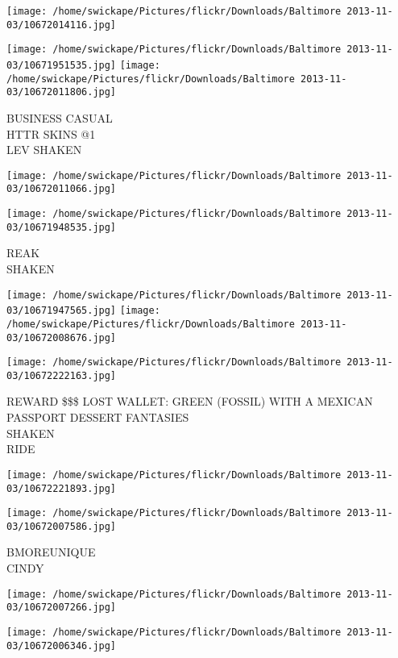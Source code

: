 \documentclass[10pt,letterpaper]{article}
\begin{document}
\texttt{[image: /home/swickape/Pictures/flickr/Downloads/Baltimore 2013-11-03/10672014116.jpg]}

\vspace{0.25in}
\texttt{[image: /home/swickape/Pictures/flickr/Downloads/Baltimore 2013-11-03/10671951535.jpg]}
\texttt{[image: /home/swickape/Pictures/flickr/Downloads/Baltimore 2013-11-03/10672011806.jpg]}

BUSINESS CASUAL\\
HTTR SKINS @1\\
LEV SHAKEN
\pagebreak

\texttt{[image: /home/swickape/Pictures/flickr/Downloads/Baltimore 2013-11-03/10672011066.jpg]}

\vspace{0.25in}
\texttt{[image: /home/swickape/Pictures/flickr/Downloads/Baltimore 2013-11-03/10671948535.jpg]}

REAK\\
SHAKEN
\pagebreak

\texttt{[image: /home/swickape/Pictures/flickr/Downloads/Baltimore 2013-11-03/10671947565.jpg]}
\texttt{[image: /home/swickape/Pictures/flickr/Downloads/Baltimore 2013-11-03/10672008676.jpg]}

\texttt{[image: /home/swickape/Pictures/flickr/Downloads/Baltimore 2013-11-03/10672222163.jpg]}

REWARD \$\$\$ LOST WALLET: GREEN (FOSSIL) WITH A MEXICAN PASSPORT DESSERT FANTASIES\\
SHAKEN\\
RIDE
\pagebreak

\texttt{[image: /home/swickape/Pictures/flickr/Downloads/Baltimore 2013-11-03/10672221893.jpg]}

\vspace{0.25in}
\texttt{[image: /home/swickape/Pictures/flickr/Downloads/Baltimore 2013-11-03/10672007586.jpg]}

BMOREUNIQUE\\
CINDY
\pagebreak

\texttt{[image: /home/swickape/Pictures/flickr/Downloads/Baltimore 2013-11-03/10672007266.jpg]}

\vspace{0.25in}
\texttt{[image: /home/swickape/Pictures/flickr/Downloads/Baltimore 2013-11-03/10672006346.jpg]}
\end{document}
